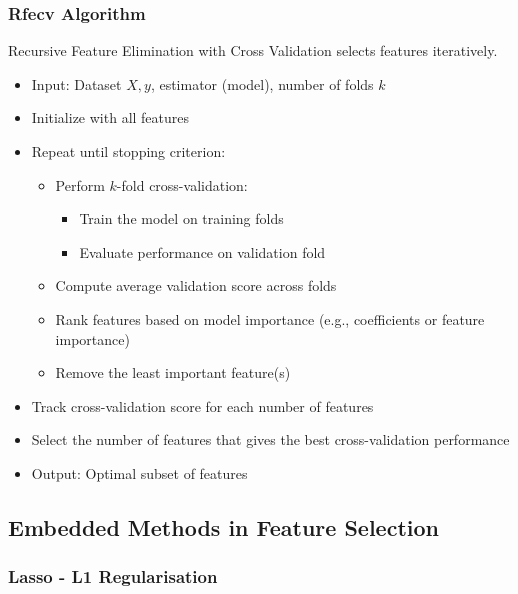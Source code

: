 \documentclass[10pt,a4paper]{article}
\begin{document}
	
	\subsubsection{Rfecv Algorithm}
	
	Recursive Feature Elimination with Cross Validation selects features iteratively.
	\begin{itemize}
		\item Input: Dataset $X, y$, estimator (model), number of folds $k$

		\item Initialize with all features

		\item Repeat until stopping criterion:
		\begin{itemize}
			\item Perform $k$-fold cross-validation:
			\begin{itemize}
				\item Train the model on training folds
				\item Evaluate performance on validation fold
			\end{itemize}

			\item Compute average validation score across folds

			\item Rank features based on model importance (e.g., coefficients or feature importance)

			\item Remove the least important feature(s)
		\end{itemize}

		\item Track cross-validation score for each number of features

		\item Select the number of features that gives the best cross-validation performance

		\item Output: Optimal subset of features
	\end{itemize}

	\subsection{Embedded Methods in Feature Selection}

	\subsubsection{Lasso - L1 Regularisation}
\end{document}
